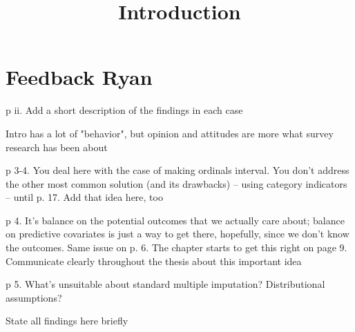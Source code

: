 \documentclass[12pt]{article}
\title{Introduction}
\date{}
\begin{document}
\maketitle

\section*{Feedback Ryan}
	\begin{coi}
		\item p ii. Add a short description of the findings in each case
		\item Intro has a lot of "behavior", but opinion and attitudes are more what survey research has been about
		\item p 3-4. You deal here with the case of making ordinals interval. You don't address the other most common solution (and its drawbacks) -- using category indicators -- until p. 17. Add that idea here, too
		\item p 4. It's balance on the potential outcomes that we actually care about; balance on predictive covariates is just a way to get there, hopefully, since we don't know the outcomes. Same issue on p. 6. The chapter starts to get this right on page 9. Communicate clearly throughout the thesis about this important idea
		\item p 5. What's unsuitable about standard multiple imputation? Distributional assumptions?
		\item State all findings here briefly
	\end{coi}
\end{document}
